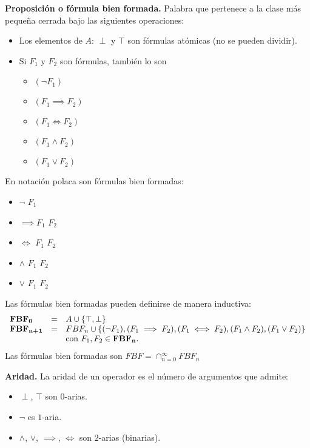 \begin{defn}{\textbf{Proposición o fórmula bien formada.}}
	Palabra que pertenece a la clase más pequeña cerrada bajo las siguientes operaciones:
	\begin{itemize}
		\item Los elementos de $A$: $\perp$ y $\top$ son fórmulas atómicas (no se pueden dividir).
		\item Si $F_1$ y $F_2$ son fórmulas, también lo son
		\begin{itemize}
			\item $(\neg F_1)$
			\item $(F_1\implies F_2)$
			\item $(F_1\iff F_2)$
			\item $(F_1\wedge F_2)$
			\item $(F_1\vee F_2)$
		\end{itemize}
	\end{itemize}
	En notación polaca son fórmulas bien formadas:
	\begin{itemize}
		\item $\neg$ $F_1$
		\item $\implies F_1$ $F_2$
		\item $\iff$ $F_1$ $F_2$
		\item $\wedge$ $F_1$ $F_2$
		\item $\vee$ $F_1$ $F_2$
	\end{itemize}
\end{defn}

\noindent Las fórmulas bien formadas pueden definirse de manera inductiva:
\begin{equation*}
\begin{array}{l l l}
	\textbf{FBF}_\textbf{0} &=& A\cup\{\top, \perp \}\\
	\textbf{FBF}_\textbf{n+1} &=& FBF_n \cup \{(\neg F_1), (F_1\implies F_2),(F_1\iff F_2),(F_1\wedge F_2),(F_1\vee F_2)\}\\ &&\text{con } F_1,F_2\in \textbf{FBF}_\textbf{n}.
\end{array}
\end{equation*}
Las fórmulas bien formadas son $FBF=\cap_{n=0}^\infty FBF_n$

\begin{defn}{\textbf{Aridad.}}
	La aridad de un operador es el número de argumentos que admite:
	\begin{itemize}
		\item $\perp$, $\top$ son $0$-arias.
		\item $\neg$ es $1$-aria.
		\item $\wedge$, $\vee$, $\implies$, $\iff$ son $2$-arias (binarias).
	\end{itemize}
\end{defn}

